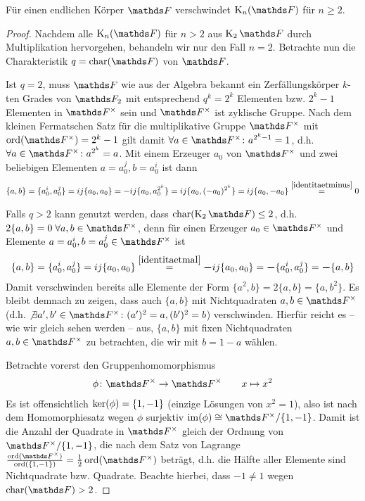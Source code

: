 \documentclass[ngerman,fontsize=11pt, paper=a4, parskip=half, titlepage=true, toc=bib]{scrartcl}
\begin{document}
\begin{Lem}
  Für einen endlichen Körper $\F$ verschwindet $\KnF$ für $n\geq 2$.
  \begin{proof}
    Nachdem alle $\KnF$ für $n>2$ aus $\K_2\F$ durch Multiplikation
    hervorgehen, behandeln wir nur den Fall $n=2$.
    Betrachte nun die Charakteristik $q=\Char(\F)$ von $\F$.

    Ist $q=2$, muss $\F$ wie aus der Algebra bekannt ein
    Zerfällungskörper $k$-ten Grades von $\F_2$ mit entsprechend
    $q^k=2^k$ Elementen bzw. $2^k-1$ Elementen in $\Fx$ sein und $\Fx$
    ist zyklische Gruppe.
    Nach dem kleinen Fermatschen Satz für die multiplikative Gruppe
    $\Fx$ mit $\Ord(\Fx)=2^k-1$ gilt damit $\forall a\in\Fx\colon a^{2^k-1}=1$, 
    d.h. $\forall a\in\Fx\colon a^{2^k} = a$.
    Mit einem Erzeuger $a_0$ von $\Fx$ und zwei beliebigen Elementen $a=a_0^j,
    b=a_0^i$ ist dann
    \begin{gather*}
      \{a,b\}=\{a_0^i, a_0^j\} = ij\{a_0,a_0\}
      = -ij\{a_0,a_0^{2^k}\} = ij\{a_0, (-a_0)^{2^k}\} =
      ij\{a_0,-a_0\} 
      \overset{\ref{identitaetminus}}{=} 0
    \end{gather*}

    Falls $q>2$ kann genutzt werden, dass $\Char(\K_2\F)\leq 2$, 
    d.h. $2\{a,b\}=0\;\forall a,b\in\Fx$,
    denn für einen Erzeuger $a_0\in\Fx$ und
    Elemente $a=a_0^i,b=a_0^j\in \Fx$ ist
    \begin{gather*}
      \{a,b\} = \{a_0^i,a_0^j\} = ij\{a_0,a_0\} 
      \overset{\ref{identitaetmal}}{=} \boldsymbol - ij\{a_0,a_0\}
      = \boldsymbol - \{a_0^i,a_0^j\} = \boldsymbol -\{a,b\} 
    \end{gather*}
    Damit verschwinden bereits alle Elemente der Form 
    $\{a^2,b\}=2\{a,b\}=\{a,b^2\}$. Es bleibt demnach zu zeigen, dass
    auch $\{a,b\}$ mit Nichtquadraten $a,b\in\Fx$
    (d.h. $\not\exists a',b'\in\Fx\colon (a')^2=a,(b')^2=b$)
    verschwinden.
    Hierfür reicht es – wie wir gleich sehen werden – aus,
    $\{a,b\}$ mit fixen Nichtquadraten
    $a,b\in\Fx$ zu betrachten, die wir mit $b=1-a$ wählen.
    
    Betrachte vorerst den Gruppenhomomorphismus
    \begin{gather*}
      \phi\colon\Fx \to \Fx
      \qquad x\mapsto x^2
    \end{gather*}
    Es ist offensichtlich $\operatorname{ker}(\phi)=\{1,-1\}$ (einzige Lösungen von
    $x^2=1$), also ist nach dem Homomorphiesatz wegen $\phi$ surjektiv
    $\im(\phi)\cong \Fx/\{1,-1\}$. Damit ist die Anzahl der Quadrate
    in $\Fx$ gleich der Ordnung von $\Fx/\{1,-1\}$, die nach dem Satz
    von Lagrange
    $\frac{\Ord(\Fx)}{\Ord(\{1,-1\})}=\frac{1}{2}\Ord(\Fx)$
    beträgt, d.h. die Hälfte aller Elemente sind Nichtquadrate
    bzw. Quadrate. Beachte hierbei, dass $-1\neq 1$ wegen $\Char(\F)>2$.


\end{proof}
\end{Lem}
\end{document}
